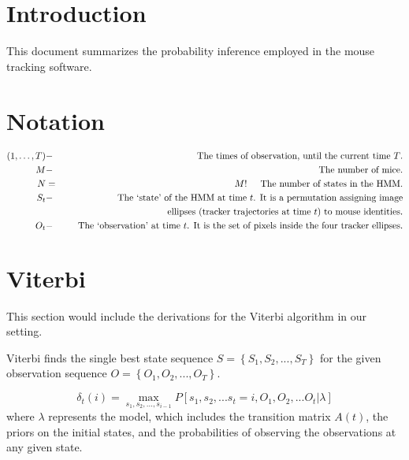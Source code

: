\documentclass[12pt]{article}
\begin{document}
\maketitle

\section{Introduction}
This document summarizes the probability inference employed in the mouse tracking software.

\section{Notation}

\begin{eqnarray*}
(1, \dots, T ) & - &\hspace{0.2in}  \text{The times of observation, until the current time $T$.}\\
M & - & \hspace{0.2in} \text{The number of mice.}\\
N & = & M!  \hspace{0.2in} \text{The number of states in the HMM.}\\
S_t & - & \hspace{0.2in} \text{The `state' of the HMM at time $t$. It is a permutation assigning image}\\
& & \hspace{0.2in} \text{ ellipses (tracker trajectories at time $t$) to mouse identities.}\\
O_t & - & \hspace{0.2in} \text{The `observation' at time $t$. It is the set of pixels inside the four tracker ellipses.}
\end{eqnarray*}



\section{Viterbi}
This section would include the derivations for the Viterbi algorithm in our setting.

Viterbi finds the single best state sequence $S = \left\{ {{S_1},{S_2},...,{S_T}} \right\}$ for the given observation sequence  $O = \left\{ {{O_1},{O_2},...,{O_T}} \right\}$.

\begin{equation}
\label{Viterbi}
{\delta _t}\left( i \right) = \mathop {\max }\limits_{{s_1},{s_2},...,{s_{i - 1}}} P\left[ {s_1}, {s_2}, ...{s_t} = i , {O_1}, {O_2}, ...{O_t} | \lambda  \right]
\end{equation}
where $\lambda$ represents the model, which includes the transition matrix $A(t)$, the priors on the initial states, and the probabilities of observing the observations at any given state.
\end{document}
